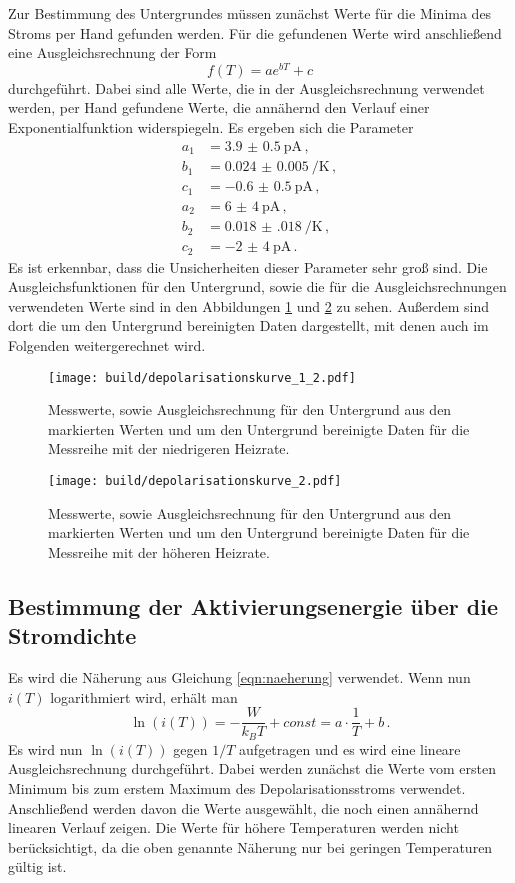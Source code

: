 Zur Bestimmung des Untergrundes müssen zunächst Werte für die Minima des Stroms per Hand gefunden
werden. Für die gefundenen Werte wird anschließend eine Ausgleichsrechnung der
Form
\begin{equation*}
  f(T)=a e^{bT} +c
\end{equation*}
durchgeführt. Dabei sind alle Werte, die in der Ausgleichsrechnung verwendet werden,
per Hand gefundene Werte, die annähernd den Verlauf einer Exponentialfunktion
widerspiegeln. Es ergeben sich die Parameter
\begin{align*}
  a_1&=\SI{3.9(05)}{\pico\ampere}  \,,\\
  b_1&=\SI{0.024(0005)}{\per\kelvin}  \,,\\
  c_1&=\SI{-0.6(05)}{\pico\ampere}  \,,\\
  a_2&=\SI{6(4)}{\pico\ampere}  \,,\\
  b_2&=\SI{0.018(018)}{\per\kelvin}  \,,\\
  c_2&=\SI{-2(4)}{\pico\ampere}  \,.
\end{align*}
Es ist erkennbar, dass die Unsicherheiten dieser Parameter sehr groß sind.
Die Ausgleichsfunktionen für den Untergrund, sowie die für die Ausgleichsrechnungen
verwendeten Werte sind in den Abbildungen \ref{fig:depol1} und \ref{fig:depol2} zu sehen.
Außerdem sind dort die um den Untergrund bereinigten Daten dargestellt, mit denen auch
im Folgenden weitergerechnet wird.

\begin{figure}
  \centering
  \texttt{[image: build/depolarisationskurve\_1\_2.pdf]}
  \caption{Messwerte, sowie Ausgleichsrechnung für den Untergrund aus den markierten Werten
  und um den Untergrund bereinigte Daten für die Messreihe mit der niedrigeren Heizrate.}
  \label{fig:depol1}
\end{figure}
\begin{figure}
  \centering
  \texttt{[image: build/depolarisationskurve\_2.pdf]}
  \caption{Messwerte, sowie Ausgleichsrechnung für den Untergrund aus den markierten Werten
  und um den Untergrund bereinigte Daten für die Messreihe mit der höheren Heizrate.}
  \label{fig:depol2}
\end{figure}

\newpage
\subsection{Bestimmung der Aktivierungsenergie über die Stromdichte}

Es wird die Näherung aus Gleichung \eqref{eqn:naeherung} verwendet. Wenn nun $i(T)$
logarithmiert wird, erhält man
\begin{equation*}
  \ln(i(T))=-\frac{W}{k_B T} + const =a\cdot \frac{1}{T} +b  \,.
\end{equation*}
Es wird nun $\ln(i(T))$ gegen $1/T$ aufgetragen und es wird eine lineare Ausgleichsrechnung
durchgeführt. Dabei werden zunächst die Werte vom ersten Minimum bis zum erstem Maximum
des Depolarisationsstroms verwendet. Anschließend werden davon die Werte ausgewählt, die
noch einen annähernd linearen Verlauf zeigen. Die Werte für höhere Temperaturen werden
nicht berücksichtigt, da die oben genannte Näherung nur bei geringen
Temperaturen gültig ist.

